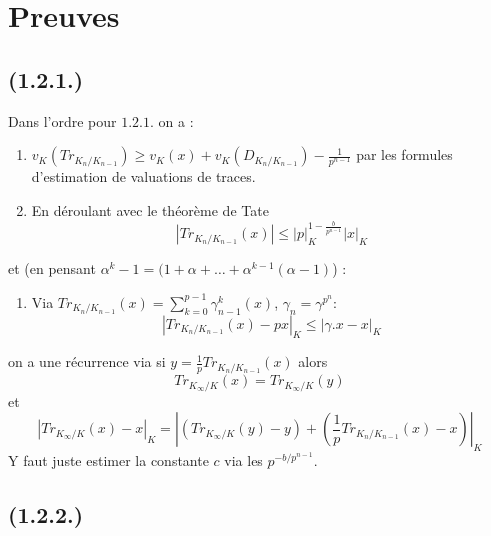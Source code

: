 \documentclass[a4paper,12pt]{article}
\theoremstyle{plain}
\theoremstyle{definition}
\theoremstyle{remark}
\begin{document}
\section{Preuves}
\subsection{(1.2.1.)}

Dans l'ordre pour $1.2.1.$ on a :
\begin{enumerate}
  \item $v_K(Tr_{K_n/K_{n-1}})\geq v_K(x)+v_K(D_{K_n/K_{n-1}}) - \frac{1}{p^{n-1}}$ par les formules 
    d'estimation de valuations de traces.
  \item En déroulant avec le théorème de Tate
    \[|Tr_{K_n/K_{n-1}}(x)|\leq |p|_K^{1-\frac{b}{p^{n-1}}}|x|_K\]
\end{enumerate}
et (en pensant $\alpha^k-1=(1+\alpha+\ldots+\alpha^{k-1}(\alpha-1)$) :
\begin{enumerate}
  \item Via $Tr_{K_n/K_{n-1}}(x)=\sum_{k=0}^{p-1}\gamma_{n-1}^k(x)$, $\gamma_n=\gamma^{p^n}$:
    \[|Tr_{K_n/K_{n-1}}(x)-px|_K\leq|\gamma.x-x|_K\]
\end{enumerate}
on a une récurrence via si 
$y=\frac{1}{p}Tr_{K_n/K_{n-1}}(x)$ alors
\[Tr_{K_\infty/K}(x)=Tr_{K_\infty/K}(y)\]
et 
\[|Tr_{K_\infty/K}(x)-x|_K=|(Tr_{K_\infty/K}(y)-y)+\left(\frac{1}{p}Tr_{K_n/K_{n-1}}(x)-x\right)|_K\]
Y faut juste estimer la constante $c$ via les 
$p^{-b/p^{n-1}}$.

\subsection{(1.2.2.)}
\end{document}
